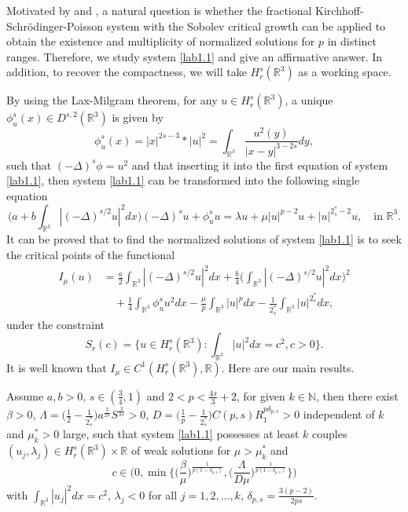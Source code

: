 \documentclass[reqno]{amsart}
\begin{document}
Motivated by \cite{H2588} and \cite{wang1388}, a natural question is whether the
fractional Kirchhoff-Schr\"odinger-Poisson system with the Sobolev critical growth can
be applied to obtain the  existence and multiplicity   of normalized solutions for $p$
in distinct ranges.
Therefore, we study system \eqref{lab1.1} and give an affirmative answer.
In addition, to recover the compactness, we will take $H^s_r(\mathbb{R}^3)$ as a
working space.

By using the Lax-Milgram theorem, for any $u\in H^s_r(\mathbb{R}^3)$, a unique
$\phi ^s_u(x)\in D^{s,2}(\mathbb{R}^3)$ is given by
\[ \label{lab1.4}
\phi ^s_u(x)=|x|^{2s-3}\ast|u|^2=\int_{\mathbb{R}^3}\frac{u^2(y)}{|x-y|^{3-2s}}dy,
\]
such that $(-\Delta)^s\phi =u^2$ and that inserting it into the first equation of
system \eqref{lab1.1}, then system \eqref{lab1.1} can be transformed into the following
single equation
\begin{equation}\label{lab1.5}
\Big(a+b\int_{\mathbb{R}^3}|(-\Delta)^{s/2}u|^2dx\Big)(-\Delta)^s u
 + \phi^s_u u= \lambda u+ \mu|u|^{p-2}u+ |u|^{2^*_s-2}u, \quad\text{in }\mathbb{R}^3.
\end{equation}
It can be proved  that to find the normalized solutions of system \eqref{lab1.1}
is to seek the critical points of the functional
\begin{align*}
  I_\mu(u)
&=\frac{a}{2}\int_{\mathbb{R}^3}|(-\Delta)^{s/2}u|^2dx
  +\frac{b}{4}\Big(\int_{\mathbb{R}^3}|(-\Delta)^{s/2}u|^2dx\Big)^2\\
&\quad +\frac{1}{4}\int_{\mathbb{R}^3}\phi ^s_uu^2dx
 -\frac{\mu}{p}\int _{\mathbb{R}^3}|u|^pdx
 -\frac{1}{2^*_s}\int _{\mathbb{R}^3}|u|^{2^*_s}dx,
\end{align*}
under the constraint
\[ \label{1.8}
S_r(c)=\Big\{u \in H^s_r(\mathbb{R}^3):\int_{\mathbb{R}^3}|u|^2dx=c^2,c>0\Big\}.
\]
It is well known that $I_\mu\in {C}^1(H^s_r(\mathbb{R}^3), \mathbb{R})$.
Here are our main results.

\begin{theorem}\label{thm1.1}
Assume $a,b>0$, $s\in(\frac{3}{4},1)$ and $2<p<\frac{4s}{3}+2$, for given
$k\in \mathbb{N}$, then there exist $\beta>0$,
$\Lambda=\big(\frac{1}{2}-\frac{1}{2^*_s}\big) a^{\frac{3}{2s}}S^{\frac{3}{2s}}>0$,
$D=\big(\frac{1}{p}-\frac{1}{2^*_s}\big)C(p,s)R_1^{p\delta_{p,s}}>0$ independent of
$k$ and $\mu^*_k>0$ large, such that system \eqref{lab1.1}  possesses at least $k$
couples $(u_j, \lambda_j)\in H^s_r(\mathbb{R}^3)\times \mathbb{R}$ of weak solutions
for $\mu>\mu^*_k$ and
\[  %
c\in\Big(0, \min\Big\{\Big(\frac{\beta}{\mu}\Big)^{\frac{1}{p(1-\delta_{p,s})}},
\Big(\frac{\Lambda}{D\mu}\Big)^{\frac{1}{p(1-\delta_{p,s})}}\Big\}\Big)
\]
with $\int_{\mathbb{R}^3}|u_j|^2dx=c^2$, $\lambda_j<0$ for all $j=1,2,...,k$,
$\delta_{p,s}=\frac{3(p-2)}{2ps}$.
\end{theorem}
\end{document}
